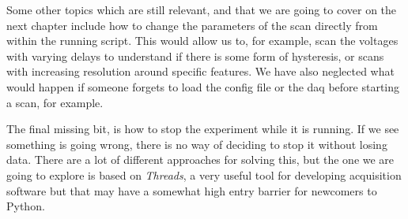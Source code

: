 Some other topics which are still relevant, and that we are going to cover on the next chapter include how to change the parameters of the scan directly from within the running script. This would allow us to, for example, scan the voltages with varying delays to understand if there is some form of hysteresis, or scans with increasing resolution around specific features. We have also neglected what would happen if someone forgets to load the config file or the daq before starting a scan, for example.

The final missing bit, is how to stop the experiment while it is running. If we see something is going wrong, there is no way of deciding to stop it without losing data. There are a lot of different approaches for solving this, but the one we are going to explore is based on \emph{Threads}, a very useful tool for developing acquisition software but that may have a somewhat high entry barrier for newcomers to Python.

